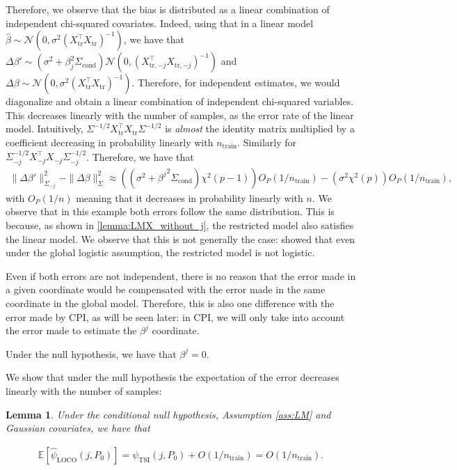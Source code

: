 \documentclass{article}
\theoremstyle{plain}
\newtheorem{lemma}[theorem]{Lemma}
\theoremstyle{definition}
\theoremstyle{remark}
\newcommand{\e}[1]{\mathbb{E}\left[#1\right]  } %
\begin{document}
Therefore, we observe that the bias is distributed as a linear combination of independent chi-squared covariates. Indeed,  using that in a linear model $\widehat{\beta}\sim\mathcal{N}(0, \sigma^2(X_{\mathrm{tr}}^\top X_\mathrm{tr})^{-1})$, we have that
$\Delta\beta'\sim (\sigma^2+\beta^2_j\Sigma_\mathrm{cond})\mathcal{N}(0, (X_{\mathrm{tr}, -j}^\top X_{\mathrm{tr}, -j})^{-1})$ and $\Delta\beta\sim\mathcal{N}(0, \sigma^2(X^\top_\mathrm{tr}X_\mathrm{tr})^{-1})$. Therefore, for independent estimates, we would diagonalize and obtain a linear combination of independent chi-squared variables. This decreases linearly with the number of samples, as the error rate of the linear model. Intuitively, $\Sigma^{-1/2}X^\top_{\mathrm{tr}}X_\mathrm{tr}\Sigma^{-1/2}$ is \textit{almost} the identity matrix multiplied by a coefficient decreasing in probability linearly with $n_\mathrm{train}$. Similarly for $\Sigma_{-j}^{-1/2}X_{-j}^\top X_{-j}\Sigma_{-j}^{-1/2}$. Therefore, we have that 
\begin{align*}
    \|\Delta\beta'\|^2_{\Sigma_{-j}}-\|\Delta\beta\|^2_\Sigma \approx \left((\sigma^2+{\beta^j}^2\Sigma_\mathrm{cond})\chi^2(p-1)\right)O_P(1/n_\mathrm{train})-\left(\sigma^2\chi^2(p)\right)O_P(1/n_\mathrm{train}),
\end{align*}
with $O_P(1/n)$ meaning that it decreases in probability linearly with $n$. We observe that in this example both errors follow the same distribution. This is because, as shown in \cref{lemma:LMX_without_j}, the restricted model also satisfies the linear model. We observe that this is not generally the case: \citet{lobo2024primerlinearclassificationmissing} showed that even under the global logistic assumption, the restricted model is not logistic. 

Even if both errors are not independent, there is no reason that the error made in a given coordinate would be compensated with the error made in the same coordinate in the global model. Therefore, this is also one difference with the error made by CPI, as will be seen later: in CPI, we will only take into account the error made to estimate the $ \beta^j$ coordinate.

Under the null hypothesis, we have that $\beta^j = 0$. 

We show that under the null hypothesis the expectation of the error decreases linearly with the number of samples:

\begin{lemma}
Under the conditional null hypothesis, Assumption \ref{ass:LM} and Gaussian covariates, we have that 

\begin{align*}
    \e{\widehat{\psi}_\mathrm{LOCO}(j, P_0)}=\psi_{\mathrm{TSI}}(j, P_0)+O(1/n_\mathrm{train})=O(1/n_\mathrm{train}).
\end{align*}
\end{lemma}
\end{document}
